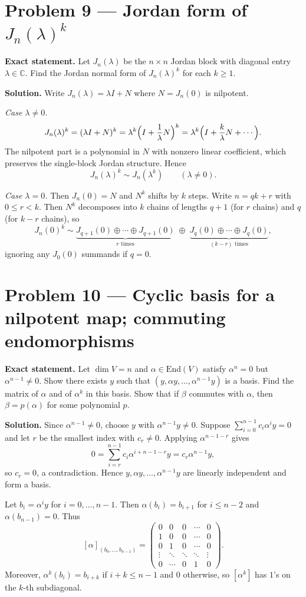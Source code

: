 \documentclass[12pt,a4paper]{article}
\theoremstyle{plain}
\theoremstyle{definition}      %
\begin{document}
\section*{Problem 9 — Jordan form of $J_n(\lambda)^k$}

\textbf{Exact statement.}
Let $J_n(\lambda)$ be the $n\times n$ Jordan block with diagonal entry $\lambda\in\mathbb C$.
Find the Jordan normal form of $J_n(\lambda)^k$ for each $k\ge 1$.

\textbf{Solution.}
Write $J_n(\lambda)=\lambda I+N$ where $N=J_n(0)$ is nilpotent.

\emph{Case $\lambda\neq 0$.}
\[
J_n(\lambda)^k=(\lambda I+N)^k=\lambda^k\Bigl(I+\frac{1}{\lambda}N\Bigr)^k
=\lambda^k\Bigl(I+\frac{k}{\lambda}N+\cdots\Bigr).
\]
The nilpotent part is a polynomial in $N$ with nonzero linear coefficient, which preserves the single-block Jordan structure.
Hence
\[
J_n(\lambda)^k \sim J_n(\lambda^k)\qquad(\lambda\neq 0).
\]

\emph{Case $\lambda=0$.}
Then $J_n(0)=N$ and $N^k$ shifts by $k$ steps.
Write $n=qk+r$ with $0\le r<k$. Then $N^k$ decomposes into $k$ chains of lengths $q+1$ (for $r$ chains) and $q$ (for $k-r$ chains),
so
\[
J_n(0)^k \sim \underbrace{J_{q+1}(0)\oplus\cdots\oplus J_{q+1}(0)}_{r\text{ times}}
\;\oplus\;
\underbrace{J_q(0)\oplus\cdots\oplus J_q(0)}_{(k-r)\text{ times}},
\]
ignoring any $J_0(0)$ summands if $q=0$.

\section*{Problem 10 — Cyclic basis for a nilpotent map; commuting endomorphisms}

\textbf{Exact statement.}
Let $\dim V=n$ and $\alpha\in\mathrm{End}(V)$ satisfy $\alpha^n=0$ but $\alpha^{n-1}\neq 0$.
Show there exists $y$ such that $(y,\alpha y,\dots,\alpha^{n-1}y)$ is a basis.
Find the matrix of $\alpha$ and of $\alpha^k$ in this basis.
Show that if $\beta$ commutes with $\alpha$, then $\beta=p(\alpha)$ for some polynomial $p$.

\textbf{Solution.}
Since $\alpha^{n-1}\neq 0$, choose $y$ with $\alpha^{n-1}y\neq 0$.
Suppose $\sum_{i=0}^{n-1} c_i\alpha^i y=0$ and let $r$ be the smallest index with $c_r\neq 0$.
Applying $\alpha^{n-1-r}$ gives
\[
0=\sum_{i=r}^{n-1} c_i\alpha^{i+n-1-r}y=c_r\alpha^{n-1}y,
\]
so $c_r=0$, a contradiction. Hence $y,\alpha y,\dots,\alpha^{n-1}y$ are linearly independent and form a basis.

Let $b_i=\alpha^i y$ for $i=0,\dots,n-1$. Then $\alpha(b_i)=b_{i+1}$ for $i\le n-2$ and $\alpha(b_{n-1})=0$.
Thus
\[
[\alpha]_{(b_0,\dots,b_{n-1})}=
\begin{pmatrix}
	0&0&0&\cdots&0\\
	1&0&0&\cdots&0\\
	0&1&0&\cdots&0\\
	\vdots&\ddots&\ddots&\ddots&\vdots\\
	0&\cdots&0&1&0
\end{pmatrix}.
\]
Moreover, $\alpha^k(b_i)=b_{i+k}$ if $i+k\le n-1$ and $0$ otherwise, so $[\alpha^k]$ has $1$'s on the $k$-th subdiagonal.
\end{document}
